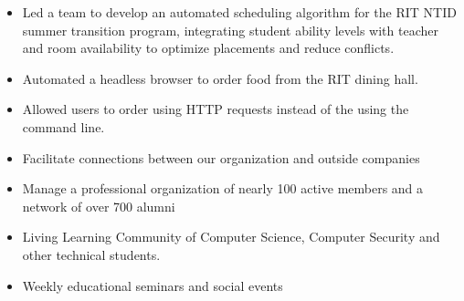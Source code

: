 \documentclass[10pt,a4paper,ragged2e,withhyper]{altacv}
\begin{document}
\begin{paracol}{2}
\smallskip \smallskip

         
  \newline
  \divider


    \begin{itemize}

    \item Led a team to develop an automated scheduling algorithm for the RIT NTID summer transition program, integrating student ability levels with teacher and room availability to optimize placements and reduce conflicts.

    \end{itemize}

\smallskip \smallskip

     

\newline

  \divider


    \begin{itemize}
    \item Automated a headless browser to order food from the RIT dining hall.
    \item Allowed users to order using HTTP requests instead of the using the command line.


    \end{itemize}

\smallskip \smallskip

     
     
  \newline


\smallskip \smallskip




    \switchcolumn
    \smallskip



\begin{itemize}
\item Facilitate connections between our organization and outside companies
\item Manage a professional organization of nearly 100 active members and a network of over 700 alumni
\item Living Learning Community of Computer Science, Computer Security and other technical students.
\item Weekly educational seminars and social events
\end{itemize}


\end{paracol}
\end{document}
